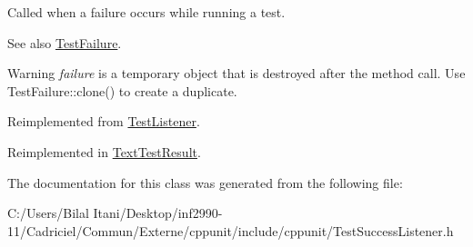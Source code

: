 Called when a failure occurs while running a test. 

\begin{DoxySeeAlso}{See also}
\hyperlink{class_test_failure}{Test\+Failure}. 
\end{DoxySeeAlso}
\begin{DoxyWarning}{Warning}
{\itshape failure} is a temporary object that is destroyed after the method call. Use Test\+Failure\+::clone() to create a duplicate. 
\end{DoxyWarning}


Reimplemented from \hyperlink{class_test_listener_a103216a5814c907f7b752b969477e765}{Test\+Listener}.



Reimplemented in \hyperlink{class_text_test_result_a05d3b0e8e51b3430092166bbc3d17708}{Text\+Test\+Result}.



The documentation for this class was generated from the following file\+:\begin{DoxyCompactItemize}
\item 
C\+:/\+Users/\+Bilal Itani/\+Desktop/inf2990-\/11/\+Cadriciel/\+Commun/\+Externe/cppunit/include/cppunit/Test\+Success\+Listener.\+h\end{DoxyCompactItemize}
